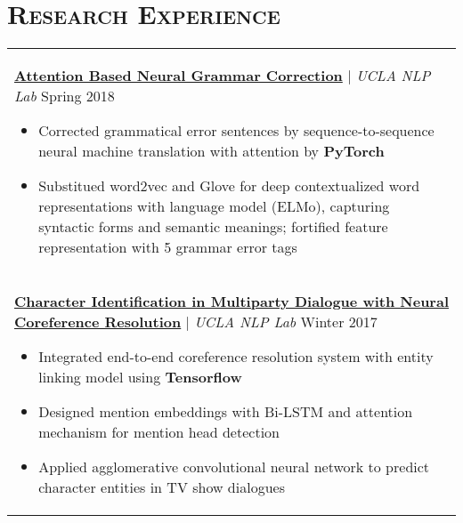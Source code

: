 \documentclass[letterpaper,11pt]{article} %
\begin{document}
{%

\section{\Large\bf\textsc{Research Experience}}
\begin{tabular}{p{18.5cm}}

\href{}{\bf{Attention Based Neural Grammar Correction}} | {\it{UCLA NLP Lab}} \hfill Spring 2018
\begin{itemize}
\item Corrected grammatical error sentences by sequence-to-sequence neural machine translation with attention by {\bf PyTorch}
\item Substitued word2vec and Glove for deep contextualized word representations with language model (ELMo), capturing syntactic forms and semantic meanings; fortified feature representation with 5 grammar error tags 
\vspace*{-\baselineskip}
\end{itemize} \\
\vspace{.1mm}

\href{}{\bf{Character Identification in Multiparty Dialogue with Neural Coreference Resolution}} | {\it{UCLA NLP Lab}} \hfill Winter 2017
\begin{itemize}
\item Integrated end-to-end coreference resolution system with entity linking model using {\bf Tensorflow} 
\item Designed mention embeddings with Bi-LSTM and attention mechanism for mention head detection 
\item Applied agglomerative convolutional neural network to predict character entities in TV show dialogues\vspace*{-\baselineskip}
\end{itemize} \\


\end{tabular}}
\end{document}
